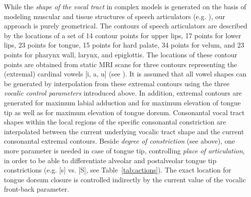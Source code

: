 \documentclass[conference]{IEEEtran}
\begin{document}
While the \textit{shape of the vocal tract} in complex models is
generated on the basis of modeling muscular and tissue structures of
speech articulators (e.g. \cite{dang2004}), our approach is purely
geometrical. The contours of speech articulators are described by the
locations of a set of 14 contour points for upper lips, 17 points for
lower lips, 23 points for tongue, 15 points for hard palate, 34 points
for velum, and 23 points for pharynx wall, larynx, and epiglottis. The
locations of these contour points are obtained from static MRI scans
for three contours representing the (extremal) cardinal vowels [i, a,
u] (see \cite{kroger2005,kroger2004}). It is assumed that all vowel
shapes can be generated by interpolation from these extremal contours
using the three \textit{vocalic control parameters} introduced above.
In addition, extremal contours are generated for maximum labial
adduction and for maximum elevation of tongue tip as well as for
maximum elevation of tongue dorsum. Consonantal vocal tract shapes
within the local regions of the specific consonantal constriction are
interpolated between the current underlying vocalic tract shape and
the current consonantal extremal contours. Beside \textit{degree of
  constriction} (see above), one more parameter is needed in case of
tongue tip, controlling \textit{place of articulation}, in order to be
able to differentiate alveolar and postalveolar tongue tip
constrictions (e.g. [s] vs. [S], see Table~\ref{tab:actions}). The
exact location for tongue dorsum closure is controlled indirectly by
the current value of the vocalic front-back parameter.
\end{document}
